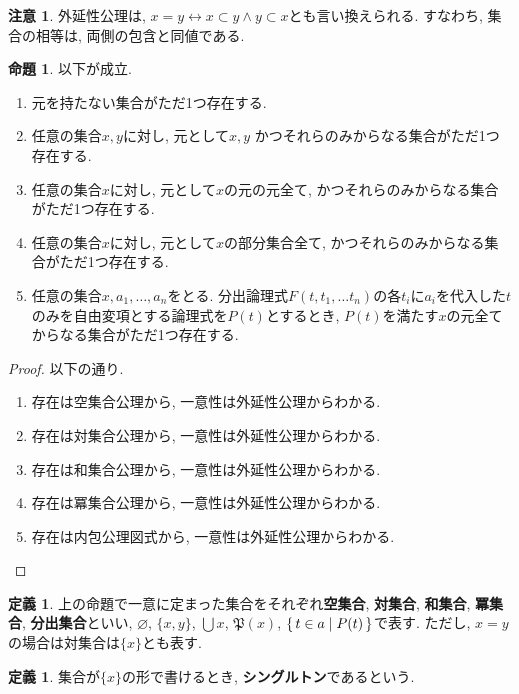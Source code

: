 \documentclass[a4paper, twoside]{bxjsarticle}
\theoremstyle{definition}
\newtheorem{prop}[thm]{命題}
\newtheorem{defn}[thm]{定義}
\newtheorem{rem}[thm]{注意}
\begin{document}
        \begin{rem}
            外延性公理は, $x=y \leftrightarrow x\subset y \land y \subset x$とも言い換えられる. すなわち, 集合の相等は, 両側の包含と同値である.
        \end{rem}
        \begin{prop}
            以下が成立.
            \begin{enumerate}
               \item 元を持たない集合がただ1つ存在する.
               \item 任意の集合$x, y$に対し, 元として$x, y$ かつそれらのみからなる集合がただ1つ存在する.
               \item 任意の集合$x$に対し, 元として$x$の元の元全て, かつそれらのみからなる集合がただ1つ存在する.
               \item 任意の集合$x$に対し, 元として$x$の部分集合全て, かつそれらのみからなる集合がただ1つ存在する.
               \item 任意の集合$x, a_1, \dots, a_n$をとる. 分出論理式$F(t, t_1, \dots t_n)$の各$t_i$に$a_i$を代入した$t$のみを自由変項とする論理式を$P(t)$とするとき, $P(t)$を満たす$x$の元全てからなる集合がただ1つ存在する.
            \end{enumerate}
            
        \end{prop}
        \begin{proof}
            以下の通り.
            \begin{enumerate}
                \item 存在は空集合公理から, 一意性は外延性公理からわかる.
                \item 存在は対集合公理から, 一意性は外延性公理からわかる.
                \item 存在は和集合公理から, 一意性は外延性公理からわかる.
                \item 存在は冪集合公理から, 一意性は外延性公理からわかる.
                \item 存在は内包公理図式から, 一意性は外延性公理からわかる.
            \end{enumerate}
        \end{proof}
        \begin{defn}
            上の命題で一意に定まった集合をそれぞれ\textbf{空集合}, \textbf{対集合}, \textbf{和集合}, \textbf{冪集合}, \textbf{分出集合}といい, $\varnothing$, $\{x, y\}$, $\bigcup x$, $\mathfrak{P}(x)$, $\set{t \in a | P(t)}$で表す. ただし, $x=y$の場合は対集合は$\{x\}$とも表す.
        \end{defn}
        \begin{defn}
            集合が$\{x\}$の形で書けるとき, \textbf{シングルトン}であるという.
        \end{defn}
        
\end{document}
